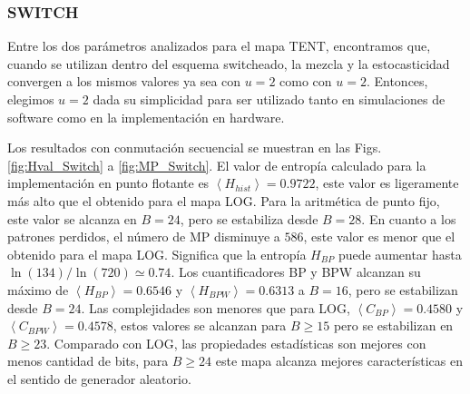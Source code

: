 \subsubsection{SWITCH} \label{sssec:switch}

Entre los dos parámetros analizados para el mapa TENT, encontramos que, cuando se utilizan dentro del esquema switcheado, la mezcla y la estocasticidad convergen a los mismos valores ya sea con $u=2$ como con $u=2$.
Entonces, elegimos $u=2$ dada su simplicidad para ser utilizado tanto en simulaciones de software como en la implementación en hardware.

Los resultados con conmutación secuencial se muestran en las Figs. \ref{fig:Hval_Switch} a \ref{fig:MP_Switch}.
El valor de entropía calculado para la implementación en punto flotante es $\left \langle H_{hist} \right \rangle = 0.9722$, este valor es ligeramente más alto que el obtenido para el mapa LOG.
Para la aritmética de punto fijo, este valor se alcanza en $B = 24$, pero se estabiliza desde $B = 28$.
En cuanto a los patrones perdidos, el número de MP disminuye a $586$, este valor es menor que el obtenido para el mapa LOG.
Significa que la entropía $H_{BP}$ puede aumentar hasta $\ln(134) / \ln(720) \simeq 0.74$.
Los cuantificadores BP y BPW alcanzan su máximo de $\left \langle H_{BP} \right \rangle = 0.6546$ y $\left \langle H_{BPW} \right \rangle = 0.6313$ a $B = 16$, pero se estabilizan desde $B = 24$.
Las complejidades son menores que para LOG, $\left \langle C_{BP} \right \rangle = 0.4580$ y $\left \langle C_{BPW} \right \rangle = 0.4578$, estos valores se alcanzan para $B \geq 15$ pero se estabilizan en $B \geq 23$.
Comparado con LOG, las propiedades estadísticas son mejores con menos cantidad de bits, para $B \geq 24$ este mapa alcanza mejores características en el sentido de generador aleatorio.

